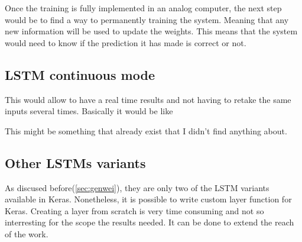 Once the training is fully implemented in an analog computer, the next step would be to find a way to permanently training the system. Meaning that any new information will be used to update the weights. This means that the system would need to know if the prediction it has made is correct or not.

\subsection{\ac{LSTM} continuous mode}

This would allow to have a real time results and not having to retake the same inputs several times. Basically it would be like %

This might be something that already exist that I didn't find anything about.

\subsection{Other \acp{LSTM} variants}

As discused before(\cref{sec:genwei}), they are only two of the \ac{LSTM} variants available in Keras. Nonetheless, it is possible to write custom layer function for Keras. Creating a layer from scratch is very time consuming and not so interresting for the scope the results needed. It can be done to extend the reach of the work.
